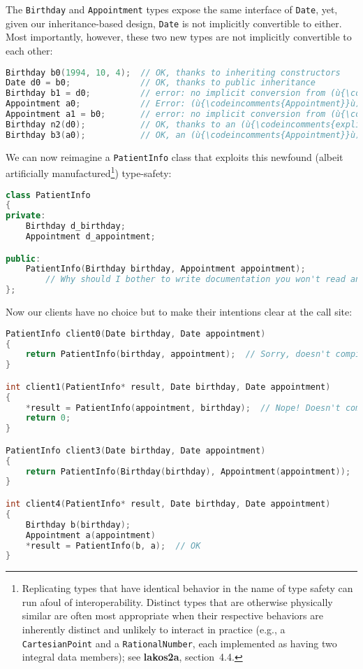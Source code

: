 \noindent The \texttt{Birthday} and \texttt{Appointment} types expose the same
interface of \texttt{Date}, yet, given our inheritance-based design,
\texttt{Date} is not implicitly convertible to either. Most importantly,
however, these two new types are not implicitly convertible to each
other:

\begin{lstlisting}[language=C++]
Birthday b0(1994, 10, 4);  // OK, thanks to inheriting constructors
Date d0 = b0;              // OK, thanks to public inheritance
Birthday b1 = d0;          // error: no implicit conversion from (ù{\codeincomments{Date}}ù)
Appointment a0;            // Error: (ù{\codeincomments{Appointment}}ù) has no default ctor.
Appointment a1 = b0;       // error: no implicit conversion from (ù{\codeincomments{Birthday}}ù)
Birthday n2(d0);           // OK, thanks to an (ù{\codeincomments{explicit}}ù) constructor in (ù{\codeincomments{Birthday}}ù)
Birthday b3(a0);           // OK, an (ù{\codeincomments{Appointment}}ù) (unfortunately) is a (ù{\codeincomments{Date}}ù).
\end{lstlisting}

\noindent We can now reimagine a \texttt{PatientInfo} class that exploits this
newfound (albeit artificially manufactured{\cprotect\footnote{Replicating
types that have identical behavior in the name of type safety can run
afoul of interoperability. Distinct types that are otherwise
physically similar are often most appropriate when their respective
behaviors are inherently distinct and unlikely to interact in practice
(e.g., a \mbox{\texttt{CartesianPoint}} and a \mbox{\texttt{RationalNumber}},
each implemented as having two integral data members); see
  \textbf{{lakos2a}}, section~4.4.}}) type-safety:

\begin{lstlisting}[language=C++]
class PatientInfo
{
private:
    Birthday d_birthday;
    Appointment d_appointment;

public:
    PatientInfo(Birthday birthday, Appointment appointment);
        // Why should I bother to write documentation you won't read anyway!?
};
\end{lstlisting}

\noindent Now our clients have no choice but to make their intentions clear at the
call site:

\begin{lstlisting}[language=C++]
PatientInfo client0(Date birthday, Date appointment)
{
    return PatientInfo(birthday, appointment);  // Sorry, doesn't compile.
}

int client1(PatientInfo* result, Date birthday, Date appointment)
{
    *result = PatientInfo(appointment, birthday);  // Nope! Doesn't compile.
    return 0;
}

PatientInfo client3(Date birthday, Date appointment)
{
    return PatientInfo(Birthday(birthday), Appointment(appointment));  // OK
}

int client4(PatientInfo* result, Date birthday, Date appointment)
{
    Birthday b(birthday);
    Appointment a(appointment)
    *result = PatientInfo(b, a);  // OK
}
\end{lstlisting}

